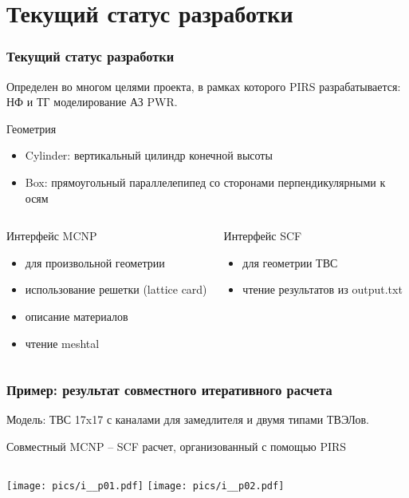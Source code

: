 \documentclass[t]{beamer}
\begin{document}
\section{Текущий статус разработки}
\begin{frame}\frametitle{Текущий статус разработки}
    Определен во многом целями проекта, в рамках которого PIRS разрабатывается: НФ и ТГ моделирование АЗ PWR.
    \begin{block}{Геометрия} 
        \begin{itemize}
            \item Cylinder: вертикальный цилиндр конечной высоты
            \item Box: прямоугольный параллелепипед со сторонами перпендикулярными к осям
        \end{itemize}
    \end{block}
    
    \begin{columns}
    \begin{block}{Интерфейс MCNP}
        \begin{itemize}
            \item для произвольной геометрии
            \item использование решетки (lattice card)
            \item описание материалов
            \item чтение meshtal
        \end{itemize}
    \end{block}

    \begin{block}{Интерфейс SCF}
        \begin{itemize}
            \item для геометрии ТВС
            \item чтение результатов из output.txt
        \end{itemize}
    \end{block}
    \end{columns}

\end{frame}


\begin{frame}\frametitle{Пример: результат совместного итеративного расчета}

    Модель: ТВС 17x17 с каналами для замедлителя и двумя типами ТВЭЛов.

    Совместный MCNP -- SCF расчет, организованный с помощью PIRS

    
    \begin{columns}
            \texttt{[image: pics/i\_\_p01.pdf]}
            \texttt{[image: pics/i\_\_p02.pdf]}
    \end{columns}

\end{frame}
\end{document}
